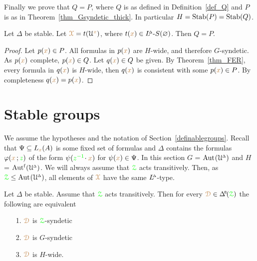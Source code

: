 Finally we prove that $Q=P$, where $Q$ is as defined in Definition~\ref{def_Q} and $P$ is as in Theorem~\ref{thm_Gsyndetic_thick}.
In particular $H={\rm Stab}(P)={\rm Stab}(Q)$.

\begin{theorem}\label{thm_P=Q}
  Let $\Delta$ be stable.
  Let ${\color{brown}\EuScript X}=t(\EuScript U^{\color{brown} x})$, where $t({\color{brown} x})\in L\kern-.5ex^{\scriptscriptstyle\Delta}\mbox{-}S(\varnothing)$.  
  Then $Q=P$.%
\end{theorem}

\begin{proof}
  Let $p({\color{brown} x})\in P$.
  All formulas in $p({\color{brown} x})$ are $H$-wide, and therefore $G$-syndetic.
  As $p({\color{brown} x})$ complete, $p({\color{brown} x})\in Q$.
  Let $q({\color{brown} x})\in Q$ be given.
  By Theorem~\ref{thm_FER}, every formula in $q({\color{brown} x})$ is $H$-wide, then $q({\color{brown} x})$ is consistent with some $p({\color{brown} x})\in P$.
  By completeness $q({\color{brown} x})=p({\color{brown} x})$.
\end{proof}


\section{Stable groups}\label{stable_groups}

We assume the hypotheses and the notation of Section~\ref{definablegroups}.
Recall that $\Psi\subseteq L_{\color{brown} x}(A)$ is some fixed set of formulas and \emph{$\Delta$\/} contains the formulas $\varphi({\color{brown} x}\,;{\color{green} z})$ of the form  $\psi({\color{green} z^{-1}}\!\cdot{\color{brown}x})$ for $\psi({\color{brown} x})\in\Psi$.
In this section \emph{$G$\/} = ${\rm Aut\kern.15ex}(\EuScript U\kern-.2ex^{\scriptscriptstyle\Delta})$ and \emph{$H$\/} = $\mbox{Aut$^{\rm f}$}(\EuScript U\kern-.2ex^{\scriptscriptstyle\Delta})$.
We will always assume that ${\color{green}\EuScript Z}$ acts transitively. 
Then, as ${\color{green}\EuScript Z}\le{\rm Aut\kern.15ex}(\EuScript U\kern-.2ex^{\scriptscriptstyle\Delta})$, all elements of ${\color{brown}\EuScript X}$ have the same $L\kern-.5ex^{\scriptscriptstyle\Delta}$-type.

\begin{theorem}
  Let $\Delta$ be stable.
  Assume that ${\color{green}\EuScript Z}$ acts transitively.
  Then for every $\mrD\in\BDelta(\grZ)$ the following are equivalent
  \begin{itemize}
  \item [1.] ${\color{brown}\EuScript D}$ is ${\color{green}\EuScript Z}$-syndetic
  \item [2.] ${\color{brown}\EuScript D}$ is $G$-syndetic
  \item [3.] ${\color{brown}\EuScript D}$ is $H$-wide.
  \end{itemize}\smallskip
\end{theorem}

